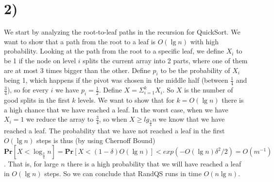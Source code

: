 \documentclass[12pt]{article}
\begin{document}
\section*{2)}

We start by analyzing the root-to-leaf paths in the recursion for QuickSort. We want to show that a path from the root to a leaf is $O(\lg n)$ with high probability. Looking at the path from the root to a specific leaf, we define $X_i$ to be 1 if the node on level $i$ splits the current array into 2 parts, where one of them are at most 3 times bigger than the other. Define $p_i$ to be the probability of $X_i$ being 1, which happens if the pivot was chosen in the middle half (between $\frac{1}{4}$ and $\frac{3}{4}$), so for every $i$ we have $p_i=\frac{1}{2}$. Define $X=\Sigma_{i=1}^k X_i$. So $X$ is the number of good splits in the first $k$ levels. We want to show that for $k=O(\lg n)$ there is a high chance that we have reached a leaf. In the worst case, when we have $X_i=1$ we reduce the array to $\frac{3}{4}$, so when $X\geq lg_{\frac{3}{4}}n$ we know that we have reached a leaf. The probability that we have not reached a leaf in the first $O(\lg n)$ steps is thus (by using Chernoff Bound) $\mathbf{Pr}[X < \log_{\frac{3}{4}}n]=\mathbf{Pr}[X<(1-\delta)O(\lg n)] < exp(-O(\lg n)\delta^2/2)=O(m^{-1})$. That is, for large $n$ there is a high probability that we will have reached a leaf in $O(\lg n)$ steps. So we can conclude that RandQS runs in time $O(n \lg n)$.
\end{document}
